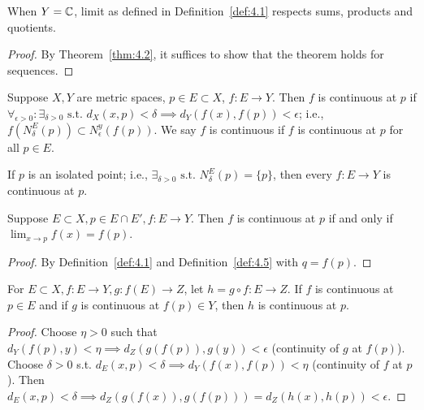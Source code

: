 \begin{theorem}[Theorem 4.4]
	\label{thm:4.4}
	When $Y=\mathbb{C}$, limit as defined in Definition~\ref{def:4.1} respects sums, products and quotients.
	\begin{proof}
		By Theorem~\ref{thm:4.2}, it suffices to show that the theorem holds for sequences.
	\end{proof}
\end{theorem}

\begin{definition}
	\label{def:4.5}
	Suppose $X,Y$ are metric spaces, $p \in E \subset X$, $f: E\to Y$. Then $f$ is continuous at $p$ if $\forall_{\epsilon > 0}: \exists_{\delta > 0} \text{ s.t. } d_X(x,p)<\delta \implies d_Y(f(x),f(p))<\epsilon$; i.e., $f(N_{\delta}^{E}(p)) \subset N_{\epsilon}^{y}(f(p))$. We say $f$ is continuous if $f$ is continuous at $p$ for all $p \in E$.
	\begin{note}
		If $p$ is an isolated point; i.e., $\exists_{\delta >0} \text{ s.t. } N_{\delta}^{E}(p)=\{p\}$, then every $f: E\to Y$ is continuous at $p$.
	\end{note}
\end{definition}

\begin{theorem}[Theorem 4.6]
	\label{thm:4.6}
	Suppose $E \subset X, p \in E \cap E', f: E\to Y$. Then $f$ is continuous at $p$ if and only if $\lim_{x\to p}{f(x)}=f(p)$.
	\begin{proof}
		By Definition~\ref{def:4.1} and Definition~\ref{def:4.5} with $q=f(p)$.
	\end{proof}
\end{theorem}

\begin{theorem}[Theorem 4.7]
	\label{thm:4.7}
	For $E \subset  X, f: E\to Y, g: f(E)\to Z$, let $h=g \circ f: E\to Z$. If $f$ is continuous at $p \in E$ and if $g$ is continuous at $f(p) \in Y$, then $h$ is continuous at $p$.
	\begin{proof}
		Choose $\eta>0$ such that $d_{Y}(f(p),y)<\eta \implies d_{Z}(g(f(p)),g(y))<\epsilon$ (continuity of $g$ at $f(p)$).
		Choose $\delta>0$ s.t. $d_E(x,p)<\delta \implies d_Y(f(x),f(p))<\eta$ (continuity of $f$ at $p$).
		Then $d_E(x,p)<\delta \implies d_Z(g(f(x)),g(f(p)))=d_Z(h(x),h(p))<\epsilon$.
	\end{proof}
\end{theorem}

